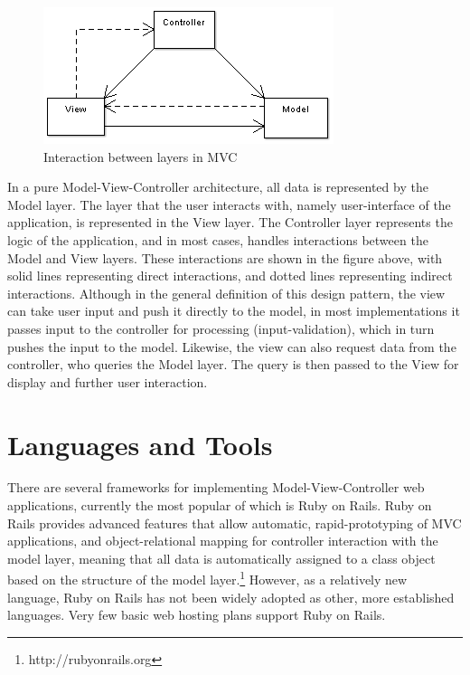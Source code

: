 \documentclass[a4paper,12pt]{report}
\begin{document}
\begin{figure}[h]
\begin{center}
\includegraphics[scale=0.6]{./images/mvc.png}
\end{center}
\caption{Interaction between layers in MVC}
\end{figure}
In a pure Model-View-Controller architecture, all data is represented by the Model layer. The layer that the user interacts with, namely user-interface of the application, is represented in the View layer. The Controller layer represents the logic of the application, and in most cases, handles interactions between the Model and View layers. These interactions are shown in the figure above, with solid lines representing direct interactions, and dotted lines representing indirect interactions. Although in the general definition of this design pattern, the view can take user input and push it directly to the model, in most implementations it passes input to the controller for processing (input-validation), which in turn pushes the input to the model. Likewise, the view can also request data from the controller, who queries the Model layer. The query is then passed to the View for display and further user interaction.

\section{Languages and Tools}
There are several frameworks for implementing Model-View-Controller web applications, currently the most popular of which is Ruby on Rails. Ruby on Rails provides advanced features that allow automatic, rapid-prototyping of MVC applications, and object-relational mapping for controller interaction with the model layer, meaning that all data is automatically assigned to a class object based on the structure of the model layer.\footnote{http://rubyonrails.org} However, as a relatively new language, Ruby on Rails has not been widely adopted as other, more established languages. Very few basic web hosting plans support Ruby on Rails. 
\end{document}
